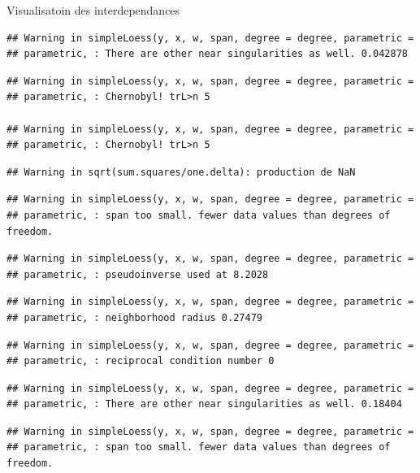 \documentclass[11pt,ignorenonframetext,]{beamer}
\begin{document}
\begin{frame}[fragile]{Visualisatoin des interdependances}
\begin{verbatim}
## Warning in simpleLoess(y, x, w, span, degree = degree, parametric =
## parametric, : There are other near singularities as well. 0.042878
\end{verbatim}

\begin{verbatim}
## Warning in simpleLoess(y, x, w, span, degree = degree, parametric =
## parametric, : Chernobyl! trL>n 5

## Warning in simpleLoess(y, x, w, span, degree = degree, parametric =
## parametric, : Chernobyl! trL>n 5
\end{verbatim}

\begin{verbatim}
## Warning in sqrt(sum.squares/one.delta): production de NaN
\end{verbatim}

\begin{verbatim}
## Warning in simpleLoess(y, x, w, span, degree = degree, parametric =
## parametric, : span too small. fewer data values than degrees of freedom.
\end{verbatim}

\begin{verbatim}
## Warning in simpleLoess(y, x, w, span, degree = degree, parametric =
## parametric, : pseudoinverse used at 8.2028
\end{verbatim}

\begin{verbatim}
## Warning in simpleLoess(y, x, w, span, degree = degree, parametric =
## parametric, : neighborhood radius 0.27479
\end{verbatim}

\begin{verbatim}
## Warning in simpleLoess(y, x, w, span, degree = degree, parametric =
## parametric, : reciprocal condition number 0
\end{verbatim}

\begin{verbatim}
## Warning in simpleLoess(y, x, w, span, degree = degree, parametric =
## parametric, : There are other near singularities as well. 0.18404
\end{verbatim}

\begin{verbatim}
## Warning in simpleLoess(y, x, w, span, degree = degree, parametric =
## parametric, : span too small. fewer data values than degrees of freedom.
\end{verbatim}


\end{frame}
\end{document}
